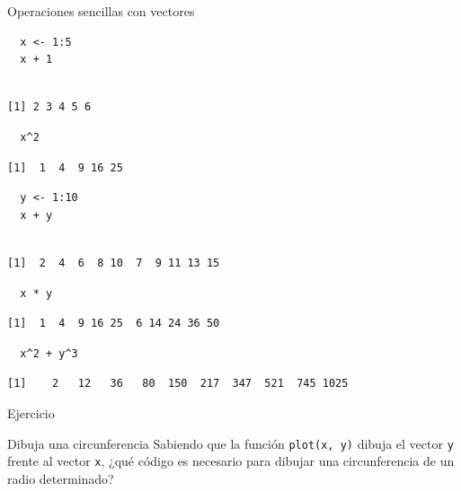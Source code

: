 \documentclass[aspectratio=169, usenames,svgnames,dvipsnames]{beamer}
\begin{document}
\begin{frame}[label={sec:org25f50e8},fragile]{Operaciones sencillas con vectores}
 \lstset{language=r,label= ,caption= ,captionpos=b,numbers=none}
\begin{lstlisting}
  x <- 1:5
  x + 1
\end{lstlisting}

\begin{verbatim}

[1] 2 3 4 5 6
\end{verbatim}


\lstset{language=r,label= ,caption= ,captionpos=b,numbers=none}
\begin{lstlisting}
  x^2
\end{lstlisting}

\begin{verbatim}
[1]  1  4  9 16 25
\end{verbatim}


\lstset{language=r,label= ,caption= ,captionpos=b,numbers=none}
\begin{lstlisting}
  y <- 1:10
  x + y
\end{lstlisting}

\begin{verbatim}

[1]  2  4  6  8 10  7  9 11 13 15
\end{verbatim}


\lstset{language=r,label= ,caption= ,captionpos=b,numbers=none}
\begin{lstlisting}
  x * y
\end{lstlisting}

\begin{verbatim}
[1]  1  4  9 16 25  6 14 24 36 50
\end{verbatim}


\lstset{language=r,label= ,caption= ,captionpos=b,numbers=none}
\begin{lstlisting}
  x^2 + y^3
\end{lstlisting}

\begin{verbatim}
[1]    2   12   36   80  150  217  347  521  745 1025
\end{verbatim}
\end{frame}




\begin{frame}[label={sec:orgd81d98c},fragile]{Ejercicio}
 \begin{block}{Dibuja una circunferencia}
Sabiendo que la función \texttt{plot(x, y)} dibuja el vector \texttt{y} frente al
vector \texttt{x}, ¿qué código es necesario para dibujar una circunferencia
de un radio determinado?
\end{block}
\end{frame}
\end{document}

